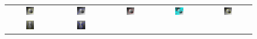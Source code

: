 \begin{figure}[t]
\centering
\renewcommand{\tabcolsep}{0.05cm}
\begin{tabular}{@{}ccccc@{}}
\includegraphics[width=0.19\textwidth]{images/L2S_compare_region/Degrade_orig}	&
\includegraphics[width=0.19\textwidth]{images/L2S_compare_region/Degrade_CV}	&
\includegraphics[width=0.19\textwidth]{images/L2S_compare_region/Degrade_Lankton}		&
\includegraphics[width=0.19\textwidth]{images/L2S_compare_region/Degrade_Li}	&
\includegraphics[width=0.19\textwidth]{images/L2S_compare_region/Degrade_ours}	
\\
\includegraphics[width=0.19\textwidth]{images/L2S_compare_region/SIM2_orig}	&
\includegraphics[width=0.19\textwidth]{images/L2S_compare_region/SIM2_CV}	&

\end{tabular}
\end{figure}
